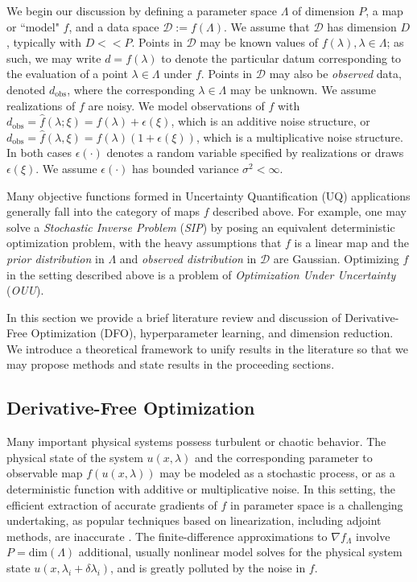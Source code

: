\documentclass{amsart}
\begin{document}
We begin our discussion by defining a parameter space $\Lambda$ of dimension $P$, a map or ``model" $f$, and a data space $\mathcal{D}:=f(\Lambda)$. We assume that $\mathcal{D}$ has dimension $D$, typically with $D<< P$. Points in $\mathcal{D}$ may be known values of $f(\lambda), \lambda\in \Lambda$; as such, we may write $d=f(\lambda)$ to denote the particular datum corresponding to the evaluation of a point $\lambda \in \Lambda$ under $f$. Points in $\mathcal{D}$ may also be \textit{observed} data, denoted $d_{\text{obs}}$, where the corresponding $\lambda\in \Lambda$ may be unknown. We assume realizations of $f$ are  noisy. We model observations of $f$ with $d_{\text{obs}}=\hat{f}(\lambda;\xi)=f(\lambda)+\epsilon(\xi)$, which is an additive noise structure, or $d_{\text{obs}}=\hat{f}(\lambda,\xi)=f(\lambda)(1+\epsilon(\xi))$, which is a multiplicative noise structure. In both cases $\epsilon(\cdot)$ denotes a random variable specified by realizations or draws $\epsilon(\xi)$. We assume $\epsilon(\cdot)$ has bounded variance $\sigma^2<\infty$.


Many objective functions formed in Uncertainty Quantification (UQ) applications generally fall into the category of maps $f$ described above. For example, one may solve a \textit{Stochastic Inverse Problem} (\textit{SIP}) by posing an equivalent deterministic optimization problem, with the heavy assumptions that $f$ is a linear map and the \textit{prior distribution} in $\Lambda$ and \textit{observed distribution} in $\mathcal{D}$ are Gaussian. Optimizing $f$ in the setting described above is a problem of \textit{Optimization Under Uncertainty} (\textit{OUU}).

In this section we provide a brief literature review and discussion of Derivative-Free Optimization (DFO), hyperparameter learning, and dimension reduction. We introduce a theoretical framework to unify results in the literature so that we may propose methods and state results in the proceeding sections.




\subsection{Derivative-Free Optimization}

Many important physical systems possess turbulent or chaotic behavior.  The physical state of the system $u(x,\lambda)$ and the corresponding parameter
to observable map $f(u(x,\lambda))$ may be modeled as a stochastic process, or as a deterministic function with additive or multiplicative noise.  
In this setting, the efficient extraction of accurate gradients of $f$ in parameter space is a challenging undertaking, as popular techniques based on
linearization, including adjoint methods, are inaccurate \cite{lea2000, Qiqi2014}.  
The finite-difference approximations to $\nabla f_\Lambda$ 
involve $P=\text{dim}(\Lambda)$ 
additional, usually nonlinear model solves for the physical system state $u(x,\lambda_i + \delta \lambda_i)$, and is greatly polluted by the noise in $f$.
\end{document}
